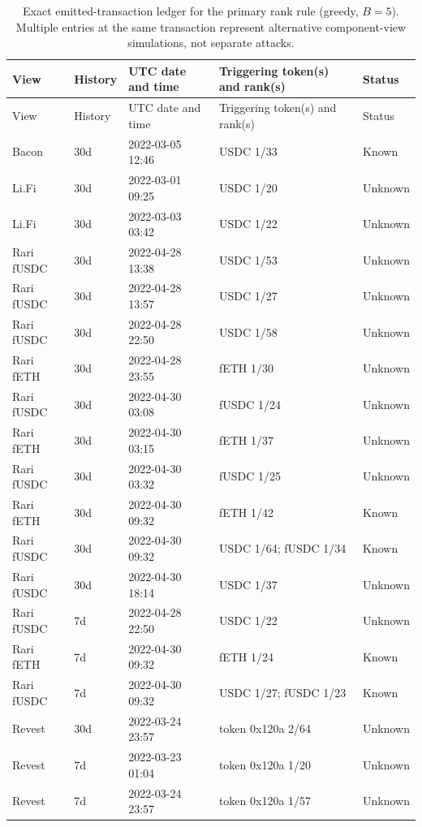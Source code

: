 \begingroup\scriptsize\setlength{\tabcolsep}{3pt}
\begin{longtable}{p{1.85cm}p{1.0cm}p{2.3cm}p{3.0cm}p{1.2cm}}
\caption{Exact emitted-transaction ledger for the primary rank rule (greedy, $B=5$). Multiple entries at the same transaction represent alternative component-view simulations, not separate attacks.}\label{tab:alerts}\\
\toprule
View & History & UTC date and time & Triggering token(s) and rank(s) & Status \\
\midrule
\endfirsthead
\toprule
View & History & UTC date and time & Triggering token(s) and rank(s) & Status \\
\midrule
\endhead
Bacon & 30d & 2022-03-05 12:46 & USDC 1/33 & Known \\
Li.Fi & 30d & 2022-03-01 09:25 & USDC 1/20 & Unknown \\
Li.Fi & 30d & 2022-03-03 03:42 & USDC 1/22 & Unknown \\
Rari fUSDC & 30d & 2022-04-28 13:38 & USDC 1/53 & Unknown \\
Rari fUSDC & 30d & 2022-04-28 13:57 & USDC 1/27 & Unknown \\
Rari fUSDC & 30d & 2022-04-28 22:50 & USDC 1/58 & Unknown \\
Rari fETH & 30d & 2022-04-28 23:55 & fETH 1/30 & Unknown \\
Rari fUSDC & 30d & 2022-04-30 03:08 & fUSDC 1/24 & Unknown \\
Rari fETH & 30d & 2022-04-30 03:15 & fETH 1/37 & Unknown \\
Rari fUSDC & 30d & 2022-04-30 03:32 & fUSDC 1/25 & Unknown \\
Rari fETH & 30d & 2022-04-30 09:32 & fETH 1/42 & Known \\
Rari fUSDC & 30d & 2022-04-30 09:32 & USDC 1/64; fUSDC 1/34 & Known \\
Rari fUSDC & 30d & 2022-04-30 18:14 & USDC 1/37 & Unknown \\
Rari fUSDC & 7d & 2022-04-28 22:50 & USDC 1/22 & Unknown \\
Rari fETH & 7d & 2022-04-30 09:32 & fETH 1/24 & Known \\
Rari fUSDC & 7d & 2022-04-30 09:32 & USDC 1/27; fUSDC 1/23 & Known \\
Revest & 30d & 2022-03-24 23:57 & token 0x120a 2/64 & Unknown \\
Revest & 7d & 2022-03-23 01:04 & token 0x120a 1/20 & Unknown \\
Revest & 7d & 2022-03-24 23:57 & token 0x120a 1/57 & Unknown \\
\bottomrule
\end{longtable}
\endgroup
